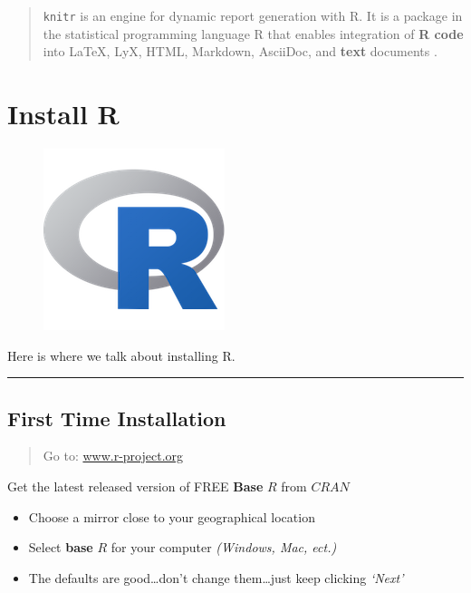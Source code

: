 \documentclass[]{book}
\providecommand{\tightlist}{%
  \setlength{\itemsep}{0pt}\setlength{\parskip}{0pt}}
\theoremstyle{definition}
\theoremstyle{definition}
\theoremstyle{definition}
\theoremstyle{remark}
\begin{document}
\begin{quote}
\texttt{knitr} is an engine for dynamic report generation with R. It is
a package in the statistical programming language R that enables
integration of \textbf{R code} into LaTeX, LyX, HTML, Markdown,
AsciiDoc, and \textbf{text} documents \citep{R-knitr}.
\end{quote}

\chapter{Install R}\label{install-r}

\begin{figure}
\centering
\includegraphics{img/Rlogo_200.png}
\caption{}
\end{figure}

Here is where we talk about installing R.

\begin{center}\rule{0.5\linewidth}{\linethickness}\end{center}

\section{First Time Installation}\label{first-time-installation}

\begin{quote}
Go to: \href{http://www.r-project.org}{www.r-project.org}
\end{quote}

Get the latest released version of FREE \textbf{Base} \(R\) from
\(CRAN\)

\begin{itemize}
\tightlist
\item
  Choose a mirror close to your geographical location
\item
  Select \textbf{base} \(R\) for your computer \emph{(Windows, Mac,
  ect.)}
\item
  The defaults are good\ldots{}don't change them\ldots{}just keep
  clicking \emph{`Next'}
\end{itemize}
\end{document}
